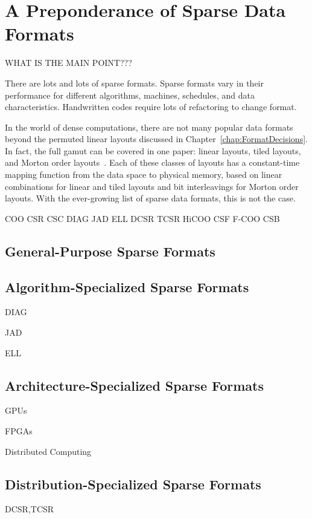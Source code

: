 \section{A Preponderance of Sparse Data Formats}\label{sec:SparseFormats}

WHAT IS THE MAIN POINT???

There are lots and lots of sparse formats.
Sparse formats vary in their performance for different algorithms, machines, schedules, and data characteristics.
Handwritten codes require lots of refactoring to change format.

In the world of dense computations, there are not many popular data formats beyond the permuted linear layouts discussed in Chapter~\ref{chap:FormatDecisions}. 
In fact, the full gamut can be covered in one paper: linear layouts, tiled layouts, and Morton order layouts~\cite{chatterjee1999recursive}.
Each of these classes of layouts has a constant-time mapping function from the data space to physical memory, based on linear combinations for linear and tiled layouts and bit interleavings for Morton order layouts.
With the ever-growing list of sparse data formats, this is not the case.


COO
CSR
CSC
DIAG
JAD
ELL
DCSR
TCSR
HiCOO
CSF
F-COO
CSB



\subsection{General-Purpose Sparse Formats}


\subsection{Algorithm-Specialized Sparse Formats}
DIAG

JAD

ELL

\subsection{Architecture-Specialized Sparse Formats}
GPUs

FPGAs

Distributed Computing




\subsection{Distribution-Specialized Sparse Formats}
DCSR,TCSR


